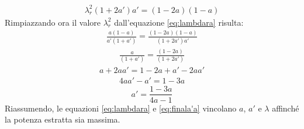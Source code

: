 \begin{align*}
\lambda_r^2 \left( 1 + 2a' \right) a' = \left( 1- 2a \right) \left(1 -a \right)
\end{align*}
Rimpiazzando ora il valore $\lambda_r^2$ dall'equazione \ref{eq:lambdara} risulta:
\begin{align*}
\frac{a \left(1 - a \right)}{a' \left(1 + a' \right)} = \frac{\left( 1 - 2a \right) \left( 1 -a \right)}{\left(1 + 2a' \right) a'}
\end{align*}
\begin{align*}
\frac{a}{\left( 1 + a' \right)} = \frac{\left( 1 - 2a \right)}{\left( 1 + 2a' \right)}
\end{align*}
\begin{align*}
a + 2 a a' = 1 - 2a + a' - 2aa'
\end{align*}
\begin{align*}
4aa' -a' = 1 - 3a
\end{align*}
\begin{equation}\label{eq:finala'a}
\boxed{a' = \frac{1 - 3a}{4a -1}}
\end{equation}
Riassumendo, le equazioni \ref{eq:lambdara} e \ref{eq:finala'a} vincolano $a$, $a'$ e $\lambda$ affinché la potenza estratta sia massima.

